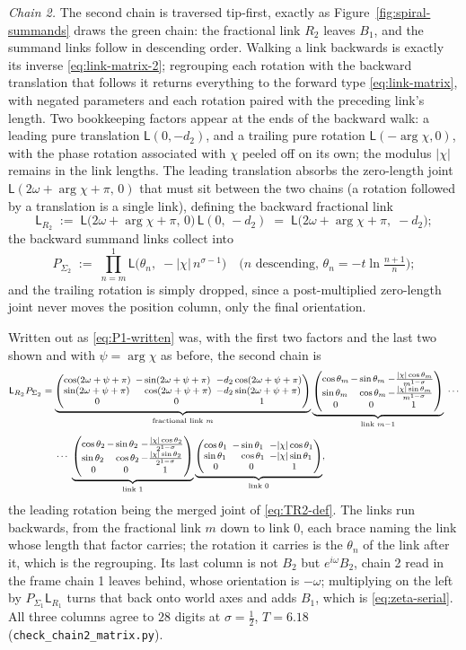 \documentclass[11pt]{article}
\makeatletter
\theoremstyle{definition}
\newcommand{\linkmatx}[2]{%
\left(\begin{array}{@{}l@{\,}l@{\,}l@{}}
\cos #1 & -\sin #1           & -\frac{|\chi|\cos #1}{#2}\\[1pt]
\sin #1 & \phantom{-}\cos #1 & -\frac{|\chi|\sin #1}{#2}\\[1pt]
\multicolumn{1}{@{}c@{\,}}{0} & \multicolumn{1}{c@{\,}}{0} & \multicolumn{1}{c@{}}{1}
\end{array}\right)}
\newcommand{\linkmat}[2]{%
\left(\begin{array}{@{}l@{\ \,}l@{\ \,}l@{}}
\cos #1 & -\sin #1           & #2\cos #1\\
\sin #1 & \phantom{-}\cos #1 & #2\sin #1\\
\multicolumn{1}{@{}c@{\ \,}}{0} & \multicolumn{1}{c@{\ \,}}{0} & \multicolumn{1}{c@{}}{1}
\end{array}\right)}
\makeatother
\begin{document}
\emph{Chain 2.} The second chain is traversed tip-first, exactly as
Figure~\ref{fig:spiral-summands} draws the green chain: the fractional
link $R_{2}$ leaves $B_1$, and the summand links follow in descending
order.
Walking a link backwards is exactly its inverse \eqref{eq:link-matrix-2};
regrouping each rotation with the backward translation that follows it
returns everything to the forward type \eqref{eq:link-matrix}, with
negated parameters and each rotation paired with the preceding link's
length. Two bookkeeping factors appear at the ends of the backward walk: a
leading pure translation $\mathsf L(0,-d_2)$, and a trailing pure rotation
$\mathsf L(-\arg\chi,0)$, with the phase rotation associated with $\chi$
peeled off on its own; the modulus $|\chi|$ remains in the link lengths.
The leading translation absorbs the zero-length joint
$\mathsf L(2\omega+\arg\chi+\pi,\,0)$ that must sit between the two chains (a
rotation followed by a translation is a single link), defining the
backward fractional link
\begin{equation}\label{eq:TR2-def}
\mathsf L_{R_{2}}
\;:=\;
\mathsf L\bigl(2\omega+\arg\chi+\pi,\,0\bigr)\,
\mathsf L(0,\,-d_2)
\;=\;
\mathsf L\bigl(2\omega+\arg\chi+\pi,\;-d_2\bigr);
\end{equation}
the backward summand links collect into
\begin{equation}\label{eq:P2-def}
P_{\Sigma_2}
\;:=\;
\prod_{n=m}^{1}\mathsf L\bigl(\theta_n,\;-|\chi|\,n^{\sigma-1}\bigr)
\quad\text{($n$ descending, $\theta_n=-t\ln\tfrac{n+1}{n}$)};
\end{equation}
and the trailing rotation is simply dropped, since a post-multiplied
zero-length joint never moves the position column, only the final
orientation.

Written out as \eqref{eq:P1-written} was, with the first two factors and the last
two shown and with $\psi=\arg\chi$ as before, the second chain is
\begin{equation}\label{eq:P2-written}
\footnotesize
\begin{aligned}
\mathsf L_{R_{2}}P_{\Sigma_2}
&=\underbrace{\linkmat{(2\omega+\psi+\pi)}{-d_2}}_{\text{fractional link }m}
\underbrace{\linkmatx{\theta_m}{m^{1-\sigma}}}_{\text{link }m-1}\;\cdots\\[3pt]
&\hphantom{{}={}}\cdots\;
\underbrace{\linkmatx{\theta_2}{2^{1-\sigma}}}_{\text{link }1}
\underbrace{\linkmat{\theta_1}{-|\chi|}}_{\text{link }0},
\end{aligned}
\end{equation}
the leading rotation being the merged joint of \eqref{eq:TR2-def}. The links run
backwards, from the fractional link $m$ down to link $0$, each brace naming the
link whose length that factor carries; the rotation it carries is the $\theta_n$
of the link after it, which is the regrouping. Its
last column is not $B_2$ but $e^{i\omega}B_2$, chain 2 read in the frame chain 1
leaves behind, whose orientation is $-\omega$; multiplying on the left by
$P_{\Sigma_1}\mathsf L_{R_{1}}$ turns that back onto world axes and adds $B_1$, which
is \eqref{eq:zeta-serial}. All three columns agree to $28$ digits at
$\sigma=\tfrac12$, $T=6.18$ (\texttt{check\_chain2\_matrix.py}).
\end{document}
